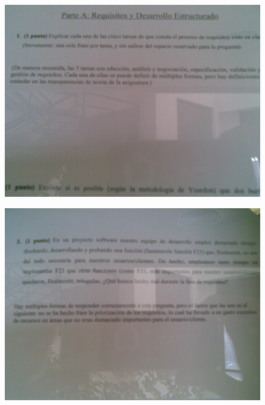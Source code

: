 \documentclass[12pt,a4paper]{report}
\begin{document}
\begin{figure}
  \includegraphics[width=\textwidth]{./images/jun/Imagen073.jpg}
\end{figure}
\begin{figure}
  \includegraphics[width=\textwidth]{./images/jun/Imagen076.jpg}
\end{figure}
\end{document}
